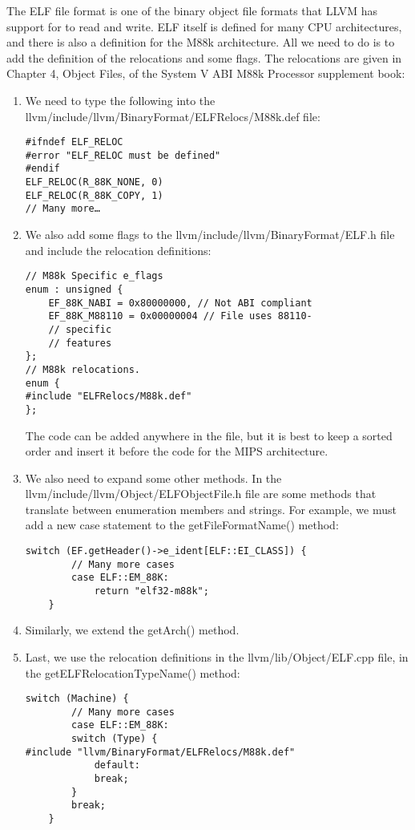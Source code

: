 The ELF file format is one of the binary object file formats that LLVM has support for to read and write. ELF itself is defined for many CPU architectures, and there is also a definition for the M88k architecture. All we need to do is to add the definition of the relocations and some flags. The relocations are given in Chapter 4, Object Files, of the System V ABI M88k Processor supplement book:\par

\begin{enumerate}
\item We need to type the following into the llvm/include/llvm/BinaryFormat/ELFRelocs/M88k.def file:
\begin{lstlisting}[caption={}]
#ifndef ELF_RELOC
#error "ELF_RELOC must be defined"
#endif
ELF_RELOC(R_88K_NONE, 0)
ELF_RELOC(R_88K_COPY, 1)
// Many more…
\end{lstlisting}

\item We also add some flags to the llvm/include/llvm/BinaryFormat/ELF.h file and include the relocation definitions:
\begin{lstlisting}[caption={}]
// M88k Specific e_flags
enum : unsigned {
	EF_88K_NABI = 0x80000000, // Not ABI compliant
	EF_88K_M88110 = 0x00000004 // File uses 88110-
	// specific
	// features
};
// M88k relocations.
enum {
#include "ELFRelocs/M88k.def"
};
\end{lstlisting}
The code can be added anywhere in the file, but it is best to keep a sorted order and insert it before the code for the MIPS architecture.

\item We also need to expand some other methods. In the llvm/include/llvm/Object/ELFObjectFile.h file are some methods that translate between enumeration members and strings. For example, we must add a new case statement to the getFileFormatName() method:
\begin{lstlisting}[caption={}]
	switch (EF.getHeader()->e_ident[ELF::EI_CLASS]) {
		// Many more cases
		case ELF::EM_88K:
			return "elf32-m88k";
	}
\end{lstlisting}

\item Similarly, we extend the getArch() method.

\item Last, we use the relocation definitions in the llvm/lib/Object/ELF.cpp file, in the getELFRelocationTypeName() method:
\begin{lstlisting}[caption={}]
	switch (Machine) {
		// Many more cases
		case ELF::EM_88K:
		switch (Type) {
#include "llvm/BinaryFormat/ELFRelocs/M88k.def"
			default:
			break;
		}
		break;
	}
\end{lstlisting}


\end{enumerate}
